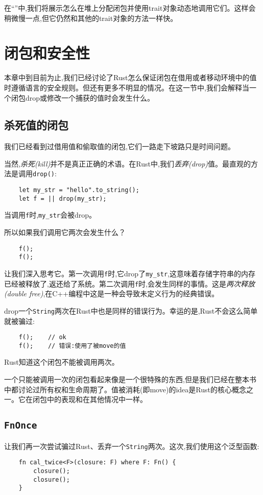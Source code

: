 在“”中,我们将展示怎么在堆上分配闭包并使用trait对象动态地调用它们。这样会稍微慢一点,但它仍然和其他的trait对象的方法一样快。

\section{闭包和安全性}

本章中到目前为止,我们已经讨论了Rust怎么保证闭包在借用或者移动环境中的值时遵循语言的安全规则。但还有更多不明显的情况。在这一节中,我们会解释当一个闭包drop或修改一个捕获的值时会发生什么。

\subsection{杀死值的闭包}
我们已经看到过借用值和偷取值的闭包,它们一路走下坡路只是时间问题。

当然,\emph{杀死(kill)}并不是真正正确的术语。在Rust中,我们\emph{丢弃(drop)}值。最直观的方法是调用\texttt{drop()}:
\begin{verbatim}
    let my_str = "hello".to_string();
    let f = || drop(my_str);
\end{verbatim}

当调用\texttt{f}时,\texttt{my\_str}会被drop。

所以如果我们调用它两次会发生什么？
\begin{verbatim}
    f();
    f();
\end{verbatim}

让我们深入思考它。第一次调用\texttt{f}时,它drop了\texttt{my\_str},这意味着存储字符串的内存已经被释放了,返还给了系统。第二次调用\texttt{f}时,会发生同样的事情。这是\emph{两次释放(double free)},在C++编程中这是一种会导致未定义行为的经典错误。

drop一个\texttt{String}两次在Rust中也是同样的错误行为。幸运的是,Rust不会这么简单就被骗过:
\begin{verbatim}
    f();    // ok
    f();    // 错误:使用了被move的值
\end{verbatim}

Rust知道这个闭包不能被调用两次。

一个只能被调用一次的闭包看起来像是一个很特殊的东西,但是我们已经在整本书中都讨论过所有权和生命周期了。值被消耗(即move)的idea是Rust的核心概念之一。它在闭包中的表现和在其他情况中一样。

\subsection{\texttt{FnOnce}}
让我们再一次尝试骗过Rust、丢弃一个\texttt{String}两次。这次,我们使用这个泛型函数:
\begin{verbatim}
    fn cal_twice<F>(closure: F) where F: Fn() {
        closure();
        closure();
    }
\end{verbatim}

